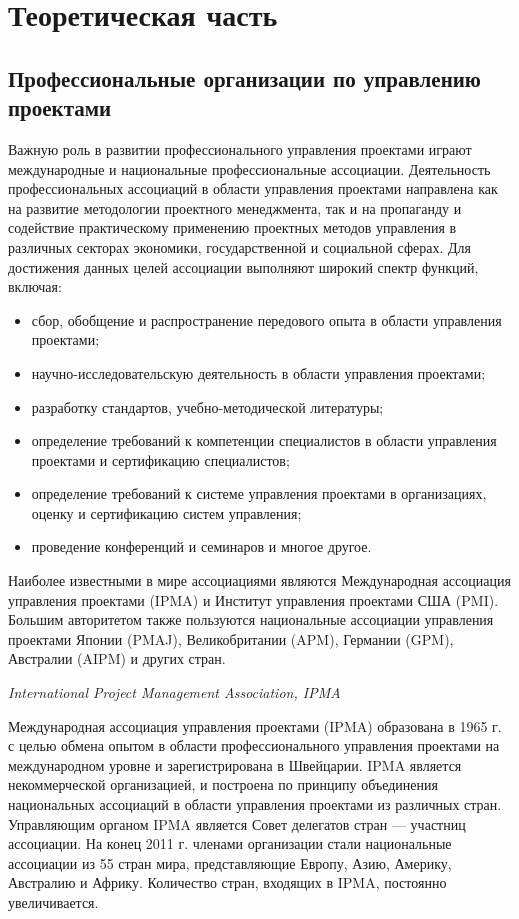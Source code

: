 \section{Теоретическая часть}
\subsection{Профессиональные организации по управлению проектами}

Важную роль в развитии профессионального управления проектами играют международные и национальные профессиональные ассоциации.
Деятельность профессиональных ассоциаций в области управления проектами направлена как на развитие методологии проектного менеджмента, так и на пропаганду и содействие практическому применению проектных методов управления в различных секторах экономики, государственной и социальной сферах.
Для достижения данных целей ассоциации выполняют широкий спектр функций, включая:
\begin{itemize}
	\item сбор, обобщение и распространение передового опыта в области управления проектами;
	\item научно-исследовательскую деятельность в области управления проектами;
	\item разработку стандартов, учебно-методической литературы;
	\item  определение требований к компетенции специалистов в области управления проектами и сертификацию специалистов;
	\item  определение требований к системе управления проектами в организациях, оценку и сертификацию систем управления;
	\item  проведение конференций и семинаров и многое другое.
\end{itemize}

Наиболее известными в мире ассоциациями являются Международная ассоциация управления проектами (IPMA) и Институт управления проектами США (PMI).
Большим авторитетом также пользуются национальные ассоциации управления проектами Японии (PMAJ), Великобритании (APM), Германии (GPM), Австралии (AIPM) и других стран.

\textit{International Project Management Association, IPMA}

Международная ассоциация управления проектами (IPMA) образована в 1965 г. с целью обмена опытом в области профессионального управления проектами на международном уровне и зарегистрирована в Швейцарии.
IPMA является некоммерческой организацией, и построена по принципу объединения национальных ассоциаций в области управления проектами из различных стран.
Управляющим органом IPMA является Совет делегатов стран --- участниц ассоциации.
На конец 2011 г. членами организации стали национальные ассоциации из 55 стран мира, представляющие Европу, Азию, Америку, Австралию и Африку. Количество стран, входящих в IPMA, постоянно увеличивается.

